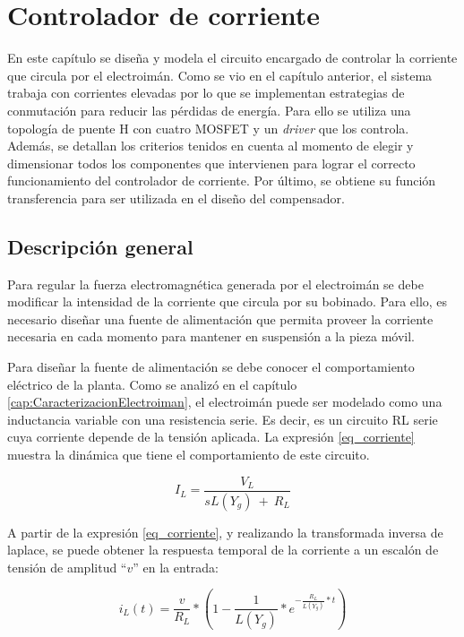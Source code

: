 \chapter{Controlador de corriente}  \label{cap:ControladorCorriente}

En este capítulo se diseña y modela el circuito encargado de controlar la corriente que circula por el electroimán. Como se vio en el capítulo anterior, el sistema trabaja con corrientes elevadas por lo que se implementan estrategias de conmutación para reducir las pérdidas de energía. Para ello se utiliza una topología de puente H con cuatro MOSFET y un \textsl{driver} que los controla. Además, se detallan los criterios tenidos en cuenta al momento de  elegir  y dimensionar todos los componentes que intervienen para lograr el correcto funcionamiento del controlador de corriente. Por último, se obtiene su función transferencia  para ser utilizada en el diseño del compensador.

\section{Descripción general}

Para regular la fuerza electromagnética generada por el electroimán se debe modificar la intensidad de la corriente que circula por su bobinado. Para ello, es necesario diseñar una fuente de alimentación que permita proveer la corriente necesaria en cada momento para mantener en suspensión a la pieza móvil. 

Para diseñar la fuente de alimentación se debe conocer el comportamiento eléctrico de la planta. Como se analizó en el capítulo \ref{cap:CaracterizacionElectroiman}, el electroimán puede ser modelado como una inductancia variable con una resistencia serie. Es decir, es un circuito RL serie cuya corriente depende de la tensión aplicada. La expresión \ref{eq_corriente} muestra la dinámica que tiene el comportamiento de este circuito.

\begin{equation} \label{eq_corriente}
	I_L=\frac{V_L}{sL(Y_g)\ +\ R_L}
\end{equation}

A partir de la expresión \ref{eq_corriente}, y realizando la transformada inversa de laplace, se puede obtener la respuesta temporal de la corriente a un escalón de tensión de amplitud ``$v$'' en la entrada: 

\begin{equation} \label{eq_corriente_temporal}
	i_L(t)=\frac{v}{R_L}*(1-\frac{1}{L(Y_g)}*e^{-\frac{R_L}{L(Y_g)}*t})
\end{equation}

